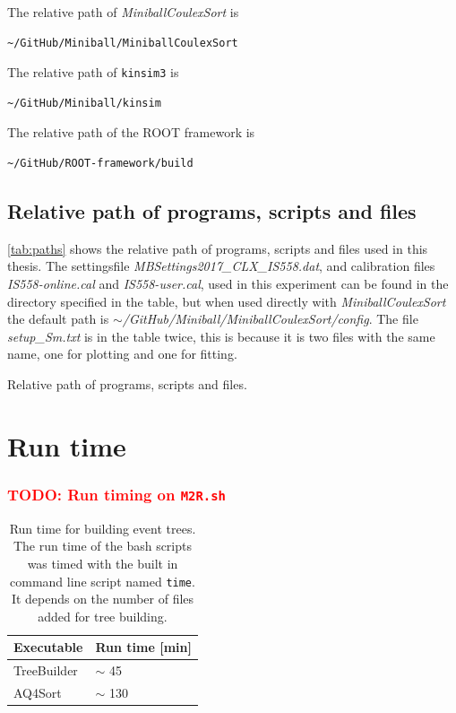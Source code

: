 \documentclass[twoside,english]{uiofysmaster/uiofysmaster}
\let\orgautoref\autoref
\renewcommand{\autoref}
        {%
		 \def\sectionautorefname{Section}%
		 \def\subsectionautorefname{Section}%
		 \def\subsubsectionautorefname{Section}%
		 \def\chapterautorefname{Chapter}%
          \orgautoref}
\begin{document}
\begin{appendices}
The relative path of \textsl{MiniballCoulexSort} is
\begin{lstlisting}[language=sh]
~/GitHub/Miniball/MiniballCoulexSort
\end{lstlisting}
The relative path of \texttt{kinsim3} is
\begin{lstlisting}[language=sh]
~/GitHub/Miniball/kinsim
\end{lstlisting}
The relative path of the ROOT framework is
\begin{lstlisting}[language=sh]
~/GitHub/ROOT-framework/build
\end{lstlisting}


\subsection{Relative path of programs, scripts and files}
\autoref{tab:paths} shows the relative path of programs, scripts and files used in this thesis. 
The settingsfile \textit{MBSettings2017\_CLX\_IS558.dat}, and calibration files \textit{IS558-online.cal} and \textit{IS558-user.cal}, used in this experiment can be found in the directory specified in the table, but when used directly with \textsl{MiniballCoulexSort} the default path is \textit{$\sim$/GitHub/Miniball/MiniballCoulexSort/config}.
The file \textit{setup\_Sm.txt} is in the table twice, this is because it is two files with the same name, one for plotting and one for fitting.

\begin{table}[ht]
    \centering
    \caption{Relative path of programs, scripts and files.}
	
	\label{tab:paths}
\end{table}


\section{Run time}

\subsubsection{\textcolor{red}{TODO: Run timing on \texttt{M2R.sh}}}

\begin{table}[ht] 
	\centering 
	\caption{Run time for building event trees. The run time of the bash scripts was timed with the built in command line script named \texttt{time}. It depends on the number of files added for tree building.}
	\label{tab:run_time}
	\begin{tabular}{ll}
		\hline
		Executable   &  Run time [min] \\
		\hline
		TreeBuilder  &  $\sim$ 45   \\
		AQ4Sort       &  $\sim$ 130  \\
		\hline
	\end{tabular}
\end{table}


\end{appendices}
\end{document}
